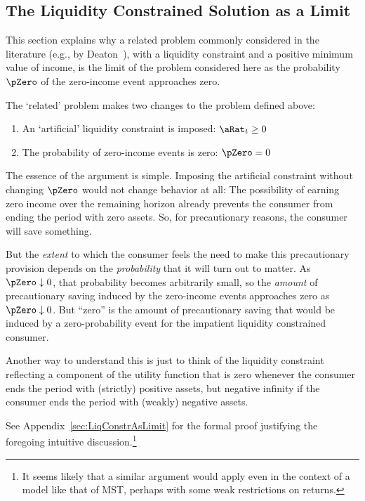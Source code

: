 \documentclass[BufferStockTheory]{subfiles}
\begin{document}
\hypertarget{The-Liquidity-Constrained-Solution-as-a-Limit}{}
\subsection{The Liquidity Constrained Solution as a Limit}\label{sec:deatonIsLimit}

This section explains why a related problem commonly considered in the literature (e.g., by Deaton~\citeyearpar{deatonLiqConstr}), with a liquidity constraint and a positive minimum value of income, is the limit of the problem considered here as the probability $\pZero$ of the zero-income event approaches zero.

The `related' problem makes two changes to the problem defined above:
\begin{enumerate}
\item An `artificial' liquidity constraint is imposed: $\aRat_{t}\geq 0$
  \item The probability of zero-income events is zero: $\pZero=0$
\end{enumerate}

The essence of the argument is simple.  Imposing the artificial constraint without changing $\pZero$ would not change behavior at all: The possibility of earning zero income over the remaining horizon already prevents the consumer from ending the period with zero assets.  So, for precautionary reasons, the consumer will save something.

But the \textit{extent} to which the consumer feels the need to make this precautionary provision depends on the \textit{probability} that it will turn out to matter.  As $\pZero \downarrow 0$, that probability becomes arbitrarily small, so the \textit{amount} of precautionary saving induced by the zero-income events approaches zero as $\pZero \downarrow 0$.  But ``zero'' is the amount of precautionary saving that would be induced by a zero-probability event for the impatient liquidity constrained consumer.

Another way to understand this is just to think of the liquidity
constraint reflecting a component of the utility
function that is zero whenever the consumer ends the period with
(strictly) positive assets, but negative infinity if the consumer
ends the period with (weakly) negative assets.

See Appendix~\ref{sec:LiqConstrAsLimit} for the formal proof justifying the
foregoing intuitive discussion.\footnote{It seems likely that a similar argument
  would apply even in the context of a model like that of MST, perhaps with some weak
  restrictions on returns.}
\end{document}
